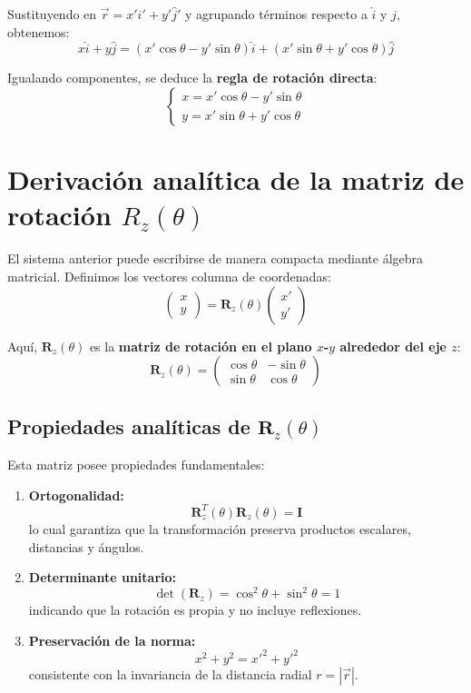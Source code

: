 Sustituyendo en \(\vec{r} = x'\hat{i}' + y'\hat{j}'\) y agrupando términos respecto a \(\hat{i}\) y \(\hat{j}\), obtenemos:
\[
 x\hat{i} + y\hat{j} = (x'\cos\theta - y'\sin\theta)\hat{i} + (x'\sin\theta + y'\cos\theta)\hat{j}
\]

Igualando componentes, se deduce la \textbf{regla de rotación directa}:
\[
\begin{cases}
 x = x'\cos\theta - y'\sin\theta \\
 y = x'\sin\theta + y'\cos\theta
\end{cases}
\]

\section{Derivación analítica de la matriz de rotación \texorpdfstring{$R_z(\theta)$}{Rz(theta)}}
El sistema anterior puede escribirse de manera compacta mediante álgebra matricial. Definimos los vectores columna de coordenadas:
\[
\begin{pmatrix} x \\ y \end{pmatrix} = \mathbf{R}_z(\theta)\begin{pmatrix} x' \\ y' \end{pmatrix}
\]

Aquí, \(\mathbf{R}_z(\theta)\) es la \textbf{matriz de rotación en el plano \(x\)-\(y\) alrededor del eje \(z\)}:
\[
\mathbf{R}_z(\theta) =
\begin{pmatrix}
\cos\theta & -\sin\theta \\
\sin\theta & \cos\theta
\end{pmatrix}
\]

\subsection{Propiedades analíticas de \texorpdfstring{$\mathbf{R}_z(\theta)$}{Rz(theta)}}
Esta matriz posee propiedades fundamentales:
\begin{enumerate}
    \item \textbf{Ortogonalidad:}
\[
\mathbf{R}_z^T(\theta)\mathbf{R}_z(\theta) = \mathbf{I}
\]
    lo cual garantiza que la transformación preserva productos escalares, distancias y ángulos.
    \item \textbf{Determinante unitario:}
\[
\det(\mathbf{R}_z) = \cos^2\theta + \sin^2\theta = 1
\]
    indicando que la rotación es propia y no incluye reflexiones.
    \item \textbf{Preservación de la norma:}
\[
 x^2 + y^2 = x'^2 + y'^2
\]
    consistente con la invariancia de la distancia radial \(r = |\vec{r}|\).
\end{enumerate}

